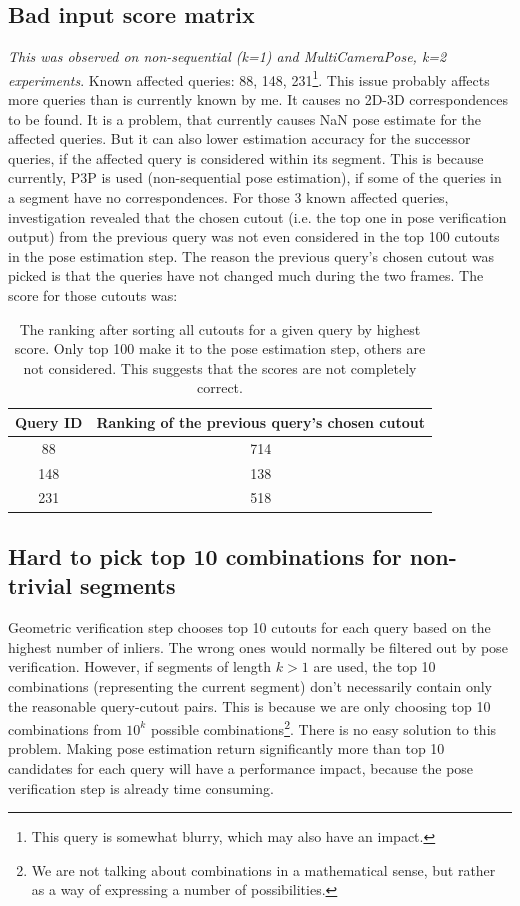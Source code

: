 \documentclass[twoside]{ctuthesis}
\theoremstyle{plain}
\theoremstyle{definition}
\theoremstyle{note}
\newcommand{\code}[1]{{\ttfamily #1%
}}
\newcommand{\topRetrieval}{100} %
\newcommand{\topGV}{10} %
\newcommand{\topPE}{10} %
\begin{document}
\subsection{Bad input \code{score} matrix}
\emph{This was observed on non-sequential (k=1) and MultiCameraPose, k=2 experiments}. Known affected queries: 88, 148, 231\footnote{This query is somewhat blurry, which may also have an impact.}. This issue probably affects more queries than is currently known by me. It causes no 2D-3D correspondences to be found. It is a problem, that currently causes \code{NaN} pose estimate for the affected queries. But it can also lower estimation accuracy for the successor queries, if the affected query is considered within its segment. This is because currently, P3P is used (non-sequential pose estimation), if some of the queries in a segment have no correspondences. For those 3 known affected queries, investigation revealed that the chosen cutout (i.e. the top one in pose verification output) from the previous query was not even considered in the top \topRetrieval{} cutouts in the pose estimation step. The reason the previous query's chosen cutout was picked is that the queries have not changed much during the two frames. The score for those cutouts was:

\begin{table}[htb!]
	\centering
	\begin{tabular}{|c|c|}
		\hline
		Query ID & Ranking of the previous query's chosen cutout \\
		\hline
		\hline
		88 & 714 \\
		\hline
		148 & 138 \\
		\hline
		231 & 518 \\
		\hline
	\end{tabular}
	\caption[Queries affected by inaccurate \code{score}]{The ranking after sorting all cutouts for a given query by highest score. Only top \topRetrieval{} make it to the pose estimation step, others are not considered. This suggests that the scores are not completely correct.}
	\label{tab:bad-scores-wrong-candidates}
\end{table}

\subsection{Hard to pick top \topPE{} combinations for non-trivial segments}
\label{subsection:hard-top-pick-top-combinations}
Geometric verification step chooses top \topGV{} cutouts for each query based on the highest number of inliers. The wrong ones would normally be filtered out by pose verification. However, if segments of length $k>1$ are used, the top \topPE{} combinations (representing the current segment) don't necessarily contain only the reasonable query-cutout pairs. This is because we are only choosing top \topPE{} combinations from $\topGV^k$ possible combinations\footnote{We are not talking about combinations in a mathematical sense, but rather as a way of expressing a number of possibilities.}. There is no easy solution to this problem. Making pose estimation return significantly more than top \topPE{} candidates for each query will have a performance impact, because the pose verification step is already time consuming.
\end{document}
